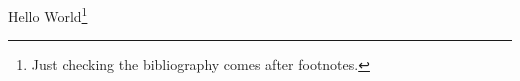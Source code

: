 
  Hello\cite{bloggs2014} World\footnote{Just checking the bibliography comes after footnotes.}

  

